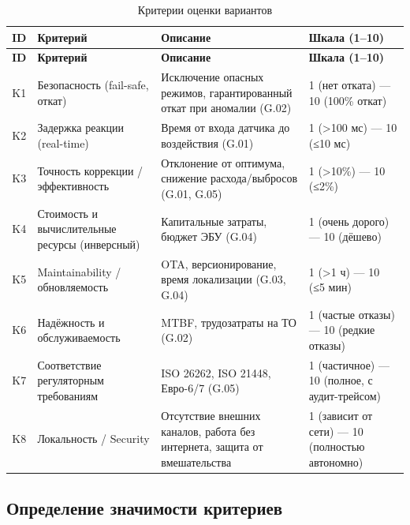 \documentclass[14pt, a4paper]{extarticle}
\begin{document}
	\vspace{\parindent}
	\noindent
	\begin{xltabular}{\textwidth}{|c|L|L|L|}
		\caption{Критерии оценки вариантов}\label{tab:criteria}\\
		\hline
		\textbf{ID} & \textbf{Критерий} & \textbf{Описание} & \textbf{Шкала (1–10)} \\
		\hline
		\endfirsthead
		\hline
		\textbf{ID} & \textbf{Критерий} & \textbf{Описание} & \textbf{Шкала (1–10)} \\
		\hline
		\endhead
		\hline
		\endfoot
		\hline
		\endlastfoot
		K1 & Безопасность (fail-safe, откат) & Исключение опасных режимов, гарантированный откат при аномалии (G.02) & 1 (нет отката) — 10 (100\% откат) \\
		\hline
		K2 & Задержка реакции (real-time) & Время от входа датчика до воздействия (G.01) & 1 (>100 мс) — 10 (≤10 мс) \\
		\hline
		K3 & Точность коррекции / эффективность & Отклонение от оптимума, снижение расхода/выбросов (G.01, G.05) & 1 (>10\%) — 10 (≤2\%) \\
		\hline
		K4 & Стоимость и вычислительные ресурсы (инверсный) & Капитальные затраты, бюджет ЭБУ (G.04) & 1 (очень дорого) — 10 (дёшево) \\
		\hline
		K5 & Maintainability / обновляемость & OTA, версионирование, время локализации (G.03, G.04) & 1 (>1 ч) — 10 (≤5 мин) \\
		\hline
		K6 & Надёжность и обслуживаемость & MTBF, трудозатраты на ТО (G.02) & 1 (частые отказы) — 10 (редкие отказы) \\
		\hline
		K7 & Соответствие регуляторным требованиям & ISO 26262, ISO 21448, Евро-6/7 (G.05) & 1 (частичное) — 10 (полное, с аудит-трейсом) \\
		\hline
		K8 & Локальность / Security & Отсутствие внешних каналов, работа без интернета, защита от вмешательства & 1 (зависит от сети) — 10 (полностью автономно) \\
		\hline
	\end{xltabular}
	\vspace{\parindent}

	\subsection{Определение значимости критериев}
	
\end{document}

